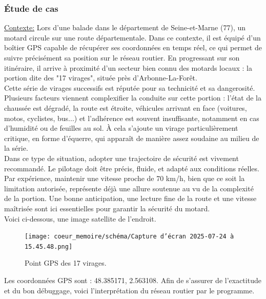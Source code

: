 \subsubsection{Étude de cas}
\underline{Contexte:} Lors d’une balade dans le département de Seine-et-Marne (77), un motard circule sur une route départementale. Dans ce contexte, il est équipé d’un boîtier GPS capable de récupérer ses coordonnées en temps réel, ce qui permet de suivre précisément sa position sur le réseau routier. En progressant sur son itinéraire, il arrive à proximité d’un secteur bien connu des motards locaux : la portion dite des "17 virages", située près d’Arbonne-La-Forêt.\\
Cette série de virages successifs est réputée pour sa technicité et sa dangerosité. Plusieurs facteurs viennent complexifier la conduite sur cette portion : l’état de la chaussée est dégradé, la route est étroite, véhicules arrivant en face (voitures, motos, cyclistes, bus...) et l’adhérence est souvent insuffisante, notamment en cas d’humidité ou de feuilles au sol. À cela s’ajoute un virage particulièrement critique, en forme d’équerre, qui apparaît de manière assez soudaine au milieu de la série. \\

Dans ce type de situation, adopter une trajectoire de sécurité est vivement recommandé. Le pilotage doit être précis, fluide, et adapté aux conditions réelles. Par expérience, maintenir une vitesse proche de 70 km/h, bien que ce soit la limitation autorisée, représente déjà une allure soutenue au vu de la complexité de la portion. Une bonne anticipation, une lecture fine de la route et une vitesse maîtrisée sont ici essentielles pour garantir la sécurité du motard.\\
Voici ci-dessous, une image satellite de l'endroit.

\begin{figure}[H]
    \centering
    \texttt{[image: coeur\_memoire/schéma/Capture d’écran 2025-07-24 à 15.45.48.png]} 
    \caption{Point GPS des 17 virages.}
\end{figure}

Les coordonnées GPS sont : 48.385171, 2.563108. Afin de s'assurer de l'exactitude et du bon débuggage, voici l'interprétation du réseau routier par le programme.

